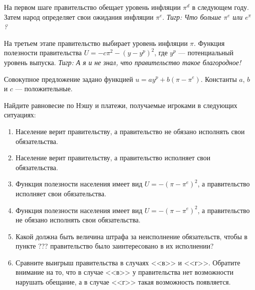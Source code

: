 \begin{problem}
\begin{sol}
\end{sol}
\end{problem}



\begin{problem}
На первом шаге правительство обещает уровень инфляции  $\pi ^{d} $  в следующем году. Затем народ определяет свои ожидания инфляции  $\pi ^{e} $. {\it Тигр: Что больше  $\pi ^{e} $  или  $e^{\pi } $ ?}\par
На третьем этапе правительство выбирает уровень инфляции  $\pi $.
Функция полезности правительства  $U=-c\pi ^{2} -\left(y-y^{p} \right)^{2} $, где  $y^{p} $  --- потенциальный уровень выпуска. {\it Тигр: А я и не знал, что правительство такое благородное!}\par
Совокупное предложение задано функцией  $u=ay^{p} +b\left(\pi -\pi ^{e} \right)$. Константы  $a$,  $b$  и  $c$  --- положительные.\par
Найдите равновесие по Нэшу и платежи, получаемые игроками в следующих ситуациях:\par
\begin{enumerate}
\item       Население верит правительству, а правительство не обязано исполнять свои обязательства.\par
\item      Население верит правительству, а правительство исполняет свои обязательства.\par
\item       Функция полезности населения имеет вид  $U=-\left(\pi -\pi ^{e} \right)^{2} $, а правительство исполняет свои обязательства.\par
\item      Функция полезности населения имеет вид  $U=-\left(\pi -\pi ^{e} \right)^{2} $, а правительство не обязано исполнять свои обязательства.\par
\item      Какой должна быть величина штрафа за неисполнение обязательств, чтобы в пункте ??? правительство было заинтересовано в их исполнении?\par
\item      Сравните выигрыш правительства в случаях <<в>> и <<г>>. Обратите внимание на то, что в случае <<в>> у правительства нет возможности нарушать обещание, а в случае <<г>> такая возможность появляется.
\end{enumerate}


\begin{sol}

\end{sol}
\end{problem}



